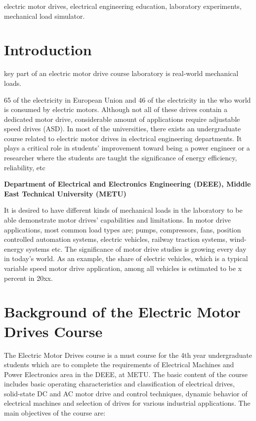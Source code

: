 \documentclass[journal]{IEEEtran}
\begin{document}
\begin{IEEEkeywords}
electric motor drives, electrical engineering education, laboratory experiments, mechanical load simulator.
\end{IEEEkeywords}


\IEEEpeerreviewmaketitle


\section{Introduction}


 key part of an electric motor drive course laboratory is real-world mechanical loads.

65  of the electricity in European Union and 46 of the electricity in the who world is consumed by electric motors. Although not all of these drives contain a dedicated motor drive, considerable amount of applications require adjustable speed drives (ASD). In most of the universities, there exists an undergraduate course related to electric motor drives in electrical engineering departments. It plays a critical role in students' improvement toward being a power engineer or a researcher where the students are taught the significance of energy efficiency, reliability, etc 

\textbf{Department of Electrical and Electronics Engineering (DEEE), Middle East Technical University (METU)}

It is desired to have different kinds of mechanical loads in the laboratory to be able demonstrate motor drives' capabilities and limitations. In motor drive applications, most common load types are; pumps, compressors, fans, position controlled automation systems, electric vehicles, railway traction systems, wind-energy systems etc. The significance of motor drive studies is growing every day in today's world. As an example, the share of electric vehicles, which is a typical variable speed motor drive application,   among all vehicles is estimated to be x percent in 20xx.







\section{Background of the Electric Motor Drives Course}
The Electric Motor Drives course is a must course for the 4th year undergraduate students which are to complete the requirements of Electrical Machines and Power Electronics area in the DEEE, at METU. The basic content of the course includes basic operating characteristics and classification of electrical drives, solid-state DC and AC motor drive and control techniques, dynamic behavior of electrical machines and selection of drives for various industrial applications. The main objectives of the course are:
\end{document}
